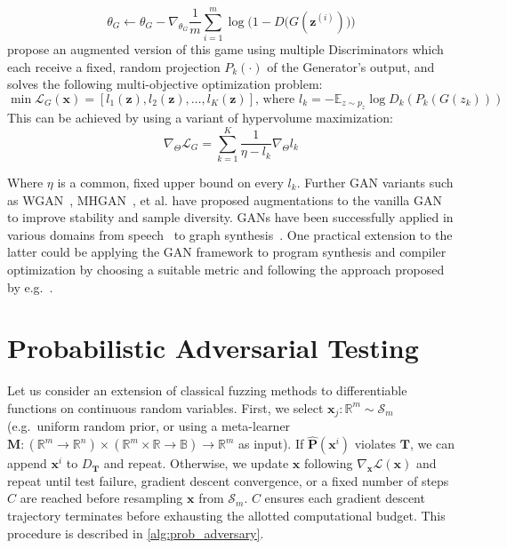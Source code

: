 \documentclass[12pt,initial,twoside,maitrise]{dms}
\numberwithin{equation}{section}
\numberwithin{table}{chapter}
\numberwithin{figure}{chapter}
\begin{document}
\begin{equation}
\theta_G \leftarrow \theta_G - \nabla_{\theta_G}\frac{1}{m}\sum_{i=1}^m \log\Big(1 - D\big(G(\mathbf z^{(i)})\big)\Big)
\end{equation}
%
\citet{albuquerque2019hgan} propose an augmented version of this game using multiple Discriminators which each receive a fixed, random projection $P_k(\cdot)$ of the Generator's output, and solves the following multi-objective optimization problem:
%
\begin{equation}
\min \mathbf{\mathcal{L}}_G(\mathbf x) = \left[l_1(\mathbf z), l_2(\mathbf z), \ldots, l_K(\mathbf z)\right] \text{, where } l_k = -\mathbb E_{z \sim p_z} \log D_k(P_k(G(z_k)))
\end{equation}
%
This can be achieved by using a variant of hypervolume maximization:
%
\begin{equation}
\nabla_\Theta \mathcal{L}_G = \sum_{k=1}^K \frac{1}{\eta - l_k}\nabla_\Theta l_k
\end{equation}

Where $\eta$ is a common, fixed upper bound on every $l_k$. Further GAN variants such as WGAN~\citep{arjovsky2017wgan}, MHGAN~\citep{turner2019mhgan}, et al. have proposed augmentations to the vanilla GAN to improve stability and sample diversity. GANs have been successfully applied in various domains from speech~\citep{donahue2019wavegan} to graph synthesis~\citep{wang2018graphgan}. One practical extension to the latter could be applying the GAN framework to program synthesis and compiler optimization by choosing a suitable metric and following the approach proposed by e.g.~\citet{adams2019learning, mendis2019compiler}.
%
\section{Probabilistic Adversarial Testing}

%
%

Let us consider an extension of classical fuzzing methods to differentiable functions on continuous random variables. First, we select $\mathbf{x}_j: \mathbb{R}^m \sim \mathcal S_m$ (e.g.\ uniform random prior, or using a meta-learner $\mathbf M: (\mathbb{R}^m \rightarrow \mathbb{R}^n) \times (\mathbb{R}^m \times \mathbb R \rightarrow \mathbb B) \rightarrow \mathbb{R}^m$ as input). If $\mathbf{\hat P}(\mathbf{x}^i)$ violates $\mathbf T$, we can append $\mathbf x^i$ to $D_\mathbf T$ and repeat. Otherwise, we update $\mathbf x$ following $\nabla_{\mathbf x}\mathcal{L}(\mathbf{x})$ and repeat until test failure, gradient descent convergence, or a fixed number of steps $C$ are reached before resampling $\mathbf{x}$ from $\mathcal S_m$. $C$ ensures each gradient descent trajectory terminates before exhausting the allotted computational budget. This procedure is described in \autoref{alg:prob_adversary}.
\end{document}
